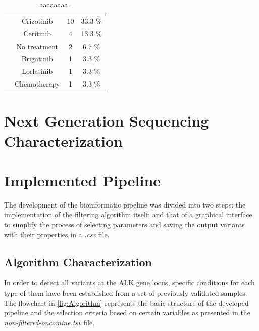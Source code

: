 \begin{table}[ht]
{\begin{tabular}{cccc}
\rowcolor[HTML]{FFFFFF}
\cellcolor[HTML]{FFFFFF} & Crizotinib & 10 & 33.3 \% \\
\rowcolor[HTML]{FFFFFF}
\cellcolor[HTML]{FFFFFF} & Ceritinib & 4 & 13.3 \% \\
\rowcolor[HTML]{FFFFFF}
\cellcolor[HTML]{FFFFFF} & No treatment & 2 & 6.7 \% \\
\rowcolor[HTML]{FFFFFF}
\cellcolor[HTML]{FFFFFF} & Brigatinib & 1 & 3.3 \% \\
\rowcolor[HTML]{FFFFFF}
\cellcolor[HTML]{FFFFFF} & Lorlatinib & 1 & 3.3 \% \\
\rowcolor[HTML]{FFFFFF}
\multirow{-7}{*}{\cellcolor[HTML]{FFFFFF}\textbf{Treatment}} & Chemotherapy & 1 & 3.3 \%
\end{tabular}}
\caption{aaaaaaaa.}
\label{tab:Patients}
\end{table}

\section{Next Generation Sequencing Characterization}


\section{Implemented Pipeline}

The development of the bioinformatic pipeline was divided into two steps: the implementation of the filtering algorithm itself; and that of a graphical interface to simplify the process of selecting parameters and saving the output variants with their properties in a \textit{.csv} file.

\subsection{Algorithm Characterization}

In order to detect all variants at the ALK gene locus, specific conditions for each type of them have been established from a set of previously validated samples. The flowchart in \autoref{fig:Algorithm} represents the basic structure of the developed pipeline and the selection criteria based on certain variables as presented in the \textit{non-filtered-oncomine.tsv} file.


